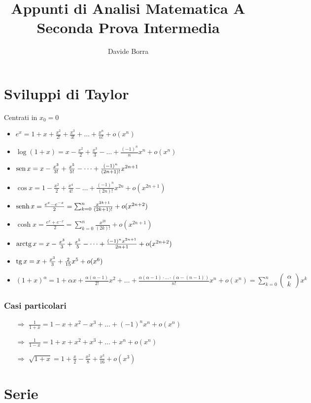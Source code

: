 \documentclass{article}
\title{Appunti di  Analisi Matematica A\\{\small Seconda Prova Intermedia}}
\author{Davide Borra}
\date{}
\renewcommand{\binom}[2]{\begin{pmatrix}#1\\#2\end{pmatrix}}
\begin{document}
\maketitle
{}
\creativecommons
\section*{Sviluppi di Taylor}
Centrati in $x_0=0$
\begin{itemize}
    \item $e^x=1+x+\frac{x^2}{2!}+\frac{x^3}{3!}+\dots+\frac{x^n}{n!}+o(x^n)$
    \item $\log(1+x)=x-\frac{x^2}{2}+\frac{x^3}{3}-\dots+\frac{(-1)^n}{n}x^n+o(x^n)$
    \item $\operatorname{sen} x = x-\frac{x^3}{3!}+\frac{x^5}{5!}-\dots+\frac{(-1)^n}{(2n+1)!}x^{2n+1}$
    \item $\cos x = 1-\frac{x^2}{2}+\frac{x^4}{4!}-\dots+\frac{(-1)^n}{(2n)!}x^{2n}+o\left(x^{2n+1}\right)$
    \item $\operatorname{senh} x = \frac{e^x-e^{-x}}{2}=\sum_{k=0}^n\frac{x^{2k+1}}{(2k+1)!}+o(x^{2n+2})$
    \item $\cosh x = \frac{e^x+e^{-x}}{2}=\sum_{k=0}^n\frac{x^{2k}}{(2k)!}+o(x^{2n+1})$
    \item $\operatorname{arctg} x = x-\frac{x^3}{3}+\frac{x^5}{5}-\dots+\frac{(-1)^nx^{2n+1}}{2n+1}+o(x^{2n+2})$
    \item $\operatorname{tg} x = x+\frac{x^3}{3}+\frac{2}{15}x^5+o(x^6)$
    \item $(1+x)^\alpha=1+\alpha x+\frac{\alpha(\alpha-1)}{2!}x^2+\dots+\frac{\alpha(\alpha-1)\cdot \ldots\cdot (\alpha-(n-1))}{n!}x^n+o(x^n)=\sum_{k=0}^n
    \binom{\alpha}{k}x^k$
\end{itemize}
\subsubsection*{Casi particolari}
\begin{itemize}
    \item[$\Rightarrow$] $\frac{1}{1+x}=1-x+x^2-x^3+\dots+(-1)^nx^n+o(x^n)$
    \item[$\Rightarrow$] $\frac{1}{1-x}=1+x+x^2+x^3+\dots+x^n+o(x^n)$
    \item[$\Rightarrow$] $\sqrt{1+x}=1+\frac{x}{2}-\frac{x^2}{8}+\frac{x^3}{16}+o(x^3)$
\end{itemize}
\section*{Serie}
\end{document}
